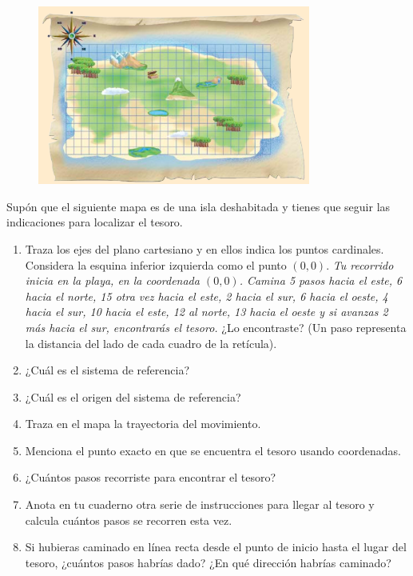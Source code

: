 \documentclass[11pt]{book}
\begin{document}
\begin{figure}[H]
  \centering
  \includegraphics[width=0.8\textwidth]{plano02.png}
  \label{fig:plano02}
\end{figure}
Supón que el siguiente mapa es de una isla deshabitada y tienes que seguir las indicaciones
para localizar el tesoro.
\begin{enumerate}
  \item Traza los ejes del plano cartesiano y en ellos indica los puntos cardinales.
        Considera la esquina inferior izquierda como el punto $(0, 0)$.
        \emph{Tu recorrido inicia en la playa, en la coordenada $(0, 0)$.
          Camina 5 pasos hacia el este, 6 hacia el norte, 15 otra vez hacia el este, 2 hacia el sur,
          6 hacia el oeste, 4 hacia el sur, 10 hacia el este, 12 al norte, 13 hacia el oeste y
          si avanzas 2 más hacia el sur, encontrarás el tesoro.} ¿Lo encontraste?
        (Un paso representa la distancia del lado de cada cuadro de la retícula).
  \item ¿Cuál es el sistema de referencia?
  \item ¿Cuál es el origen del sistema de referencia?
  \item Traza en el mapa la trayectoria del movimiento.
  \item Menciona el punto exacto en que se encuentra el tesoro usando coordenadas.
  \item ¿Cuántos pasos recorriste para encontrar el tesoro?
  \item Anota en tu cuaderno otra serie de instrucciones para llegar al tesoro y calcula cuántos
        pasos se recorren esta vez.
  \item Si hubieras caminado en línea recta desde el punto de inicio hasta el lugar del tesoro,
        ¿cuántos pasos habrías dado? ¿En qué dirección habrías caminado?
\end{enumerate}
\end{document}
